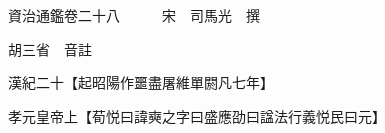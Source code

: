 










 


 
 


 

  
  
  
  
  





  
  
  
  
  
 
  

  

  
  
  



  

 
 

  
   




  

  
  


  　　資治通鑑卷二十八　　　宋　司馬光　撰

　　胡三省　音註

　　漢紀二十【起昭陽作噩盡屠維單閼凡七年】

　　孝元皇帝上【荀悦曰諱奭之字曰盛應劭曰諡法行義悦民曰元】

